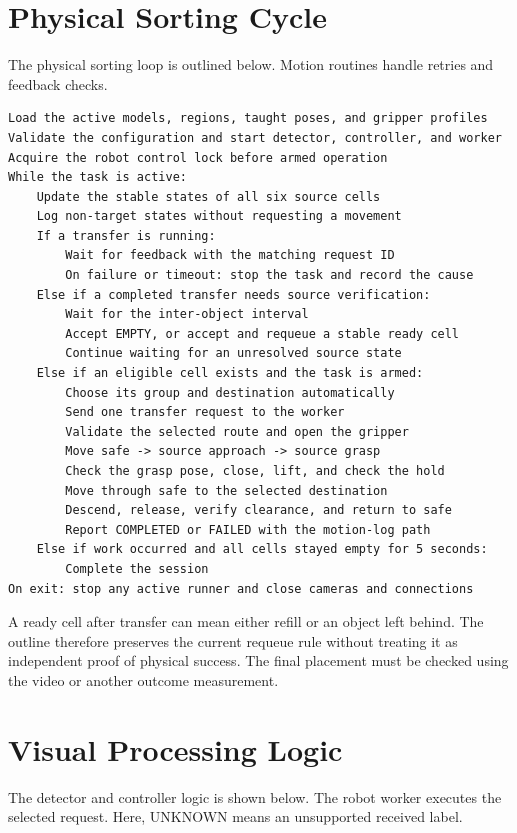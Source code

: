 \section{Physical Sorting Cycle}
The physical sorting loop is outlined below. Motion routines handle retries and feedback checks.

\begin{lstlisting}[caption={Main stages of the complete physical task}]
Load the active models, regions, taught poses, and gripper profiles
Validate the configuration and start detector, controller, and worker
Acquire the robot control lock before armed operation
While the task is active:
    Update the stable states of all six source cells
    Log non-target states without requesting a movement
    If a transfer is running:
        Wait for feedback with the matching request ID
        On failure or timeout: stop the task and record the cause
    Else if a completed transfer needs source verification:
        Wait for the inter-object interval
        Accept EMPTY, or accept and requeue a stable ready cell
        Continue waiting for an unresolved source state
    Else if an eligible cell exists and the task is armed:
        Choose its group and destination automatically
        Send one transfer request to the worker
        Validate the selected route and open the gripper
        Move safe -> source approach -> source grasp
        Check the grasp pose, close, lift, and check the hold
        Move through safe to the selected destination
        Descend, release, verify clearance, and return to safe
        Report COMPLETED or FAILED with the motion-log path
    Else if work occurred and all cells stayed empty for 5 seconds:
        Complete the session
On exit: stop any active runner and close cameras and connections
\end{lstlisting}

A ready cell after transfer can mean either refill or an object left behind. The outline therefore preserves the current requeue rule without treating it as independent proof of physical success. The final placement must be checked using the video or another outcome measurement.

\clearpage
\section{Visual Processing Logic}
The detector and controller logic is shown below. The robot worker executes the selected request. Here, UNKNOWN means an unsupported received label.

